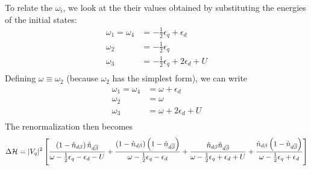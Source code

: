 \documentclass[12pt,twoside]{report}
\numberwithin{equation}{section}
\begin{document}
To relate the \(\omega_i\), we look at the their values obtained by substituting the energies of the initial states:
\begin{equation}\begin{aligned}
	\omega_1 = \omega_4 &= -\frac{1}{2}\epsilon_q + \epsilon_d\\
	\omega_2 &= -\frac{1}{2}\epsilon_q\\
	\omega_3 &= -\frac{1}{2}\epsilon_q + 2\epsilon_d + U\\
\end{aligned}\end{equation}
Defining \(\omega \equiv \omega_2\) (because \(\omega_2\) has the simplest form), we can write
\begin{equation}\begin{aligned}
	\omega_1 = \omega_4 &= \omega + \epsilon_d\\
	\omega_2 &= \omega\\
	\omega_3 &= \omega + 2\epsilon_d + U\\
\end{aligned}\end{equation}
The renormalization then becomes
\begin{equation}\begin{aligned}
	\label{vanilla:siam:ren}
	\Delta \mathcal{H} = |V_q|^2 \left[\frac{\left(1 - \hat n_{d\beta}\right)\hat n_{d\overline\beta}}{\omega - \frac{1}{2}\epsilon_q - \epsilon_d - U} + \frac{\left(1 - \hat n_{d\beta}\right)\left( 1-\hat n_{d\overline\beta} \right)}{\omega - \frac{1}{2}\epsilon_q - \epsilon_d} + \frac{\hat n_{d\beta} \hat n_{d\overline\beta}}{\omega - \frac{1}{2}\epsilon_q + \epsilon_d + U} + \frac{\hat n_{d\beta}\left( 1- \hat n_{d\overline\beta}\right) }{\omega - \frac{1}{2}\epsilon_q + \epsilon_d}\right]
\end{aligned}\end{equation}
\end{document}
